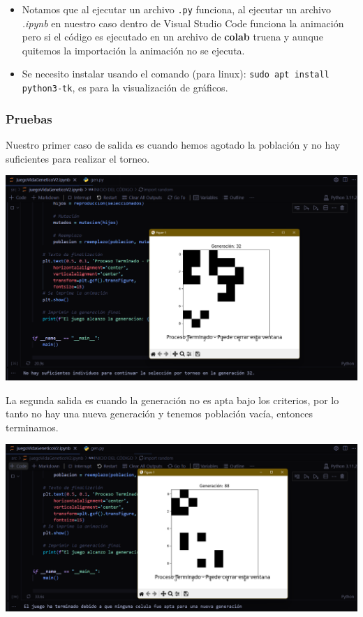 \begin{itemize}
    \item Notamos que al ejecutar un archivo \texttt{.py} funciona, al ejecutar un archivo 
    \textit{.ipynb} en nuestro caso dentro de Visual Studio Code funciona la animación pero si
    el código es ejecutado en un archivo de \textbf{colab} truena y aunque quitemos la 
    importación la animación no se ejecuta. 

    \item Se necesito instalar usando el comando (para linux): 
    \texttt{sudo apt install python3-tk}, es para la visualización de gráficos.
\end{itemize}

\subsubsection*{Pruebas}

Nuestro primer caso de salida es cuando hemos agotado la población y no hay 
suficientes para realizar el torneo.
\begin{center}
    \includegraphics[scale = .4]{IMA/selecTorneo.png}
\end{center}

La segunda salida es cuando la generación no es apta bajo los criterios, por 
lo tanto no hay una nueva generación y tenemos población vacía, entonces 
terminamos.
\begin{center}
    \includegraphics[scale = .4]{IMA/poblacionVacia.png}
\end{center}

